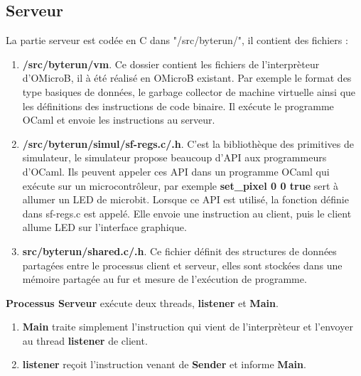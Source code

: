 \documentclass[14px]{article}
\begin{document}
	\subsection{Serveur}
	La partie serveur est codée en C dans "/src/byterun/", il contient des fichiers :
	\begin{enumerate}
		\item \textbf{/src/byterun/vm}.
		Ce dossier contient les fichiers de l'interprèteur d'OMicroB, il à été réalisé en OMicroB existant. Par exemple le format des type basiques de données, le garbage collector de machine virtuelle ainsi que les définitions des instructions de code binaire. Il exécute le programme OCaml et envoie les instructions au serveur.

		\item \textbf{/src/byterun/simul/sf-regs.c/.h}.
		C'est la bibliothèque des primitives de simulateur, le simulateur propose beaucoup d'API aux programmeurs d'OCaml. Ils peuvent appeler ces API dans un programme OCaml qui exécute sur un microcontrôleur, par exemple \textbf{set\_pixel 0 0 true} sert à allumer un LED de microbit. Lorsque ce API est utilisé, la fonction définie dans sf-regs.c est appelé. Elle envoie une instruction au client, puis le client allume LED sur l'interface graphique.

		\item \textbf{src/byterun/shared.c/.h}.
		Ce fichier définit des structures de données partagées entre le processus client et serveur, elles sont stockées dans une mémoire partagée au fur et mesure de l'exécution de programme.
	\end{enumerate}
	\textbf{Processus Serveur} exécute deux threads, \textbf{listener} et \textbf{Main}.
	\begin{enumerate}
		\item \textbf{Main} traite simplement l'instruction qui vient de l'interprèteur et l'envoyer au thread \textbf{listener} de client.
		\item \textbf{listener} reçoit l'instruction venant de \textbf{Sender} et informe \textbf{Main}.
	\end{enumerate}
\end{document}
